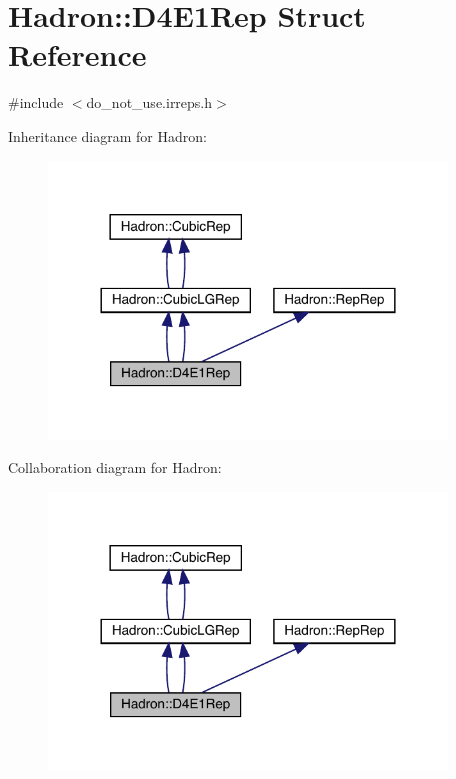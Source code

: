 \hypertarget{structHadron_1_1D4E1Rep}{}\section{Hadron\+:\+:D4\+E1\+Rep Struct Reference}
\label{structHadron_1_1D4E1Rep}


{\ttfamily \#include $<$do\+\_\+not\+\_\+use.\+irreps.\+h$>$}



Inheritance diagram for Hadron\+:\nopagebreak
\begin{figure}[H]
\begin{center}
\leavevmode
\includegraphics[width=300pt]{db/deb/structHadron_1_1D4E1Rep__inherit__graph}
\end{center}
\end{figure}


Collaboration diagram for Hadron\+:\nopagebreak
\begin{figure}[H]
\begin{center}
\leavevmode
\includegraphics[width=300pt]{da/d19/structHadron_1_1D4E1Rep__coll__graph}
\end{center}
\end{figure}

